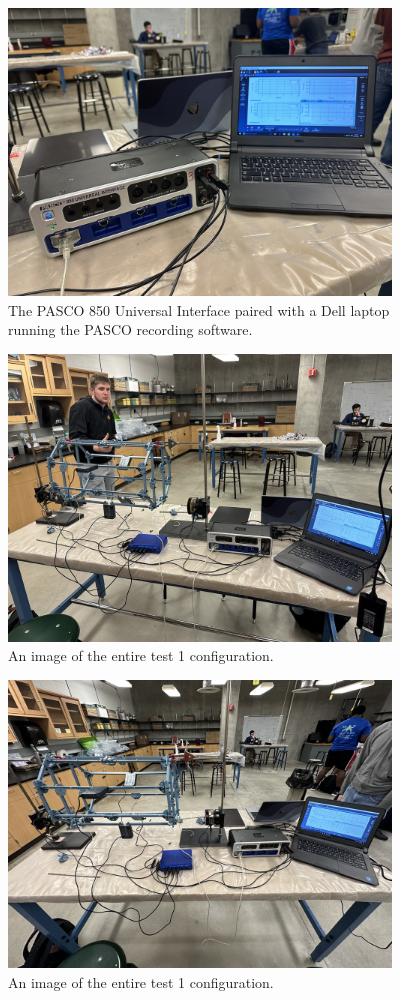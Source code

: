 \documentclass[12 pt]{report}
\begin{document}
\begin{figure}[htbp]
	\centering
	\includegraphics[width=4in]{images/IMG_1319}
	\caption{The PASCO 850 Universal Interface paired with a Dell laptop running the PASCO recording software.}
	\label{fig:test1_app_8}
\end{figure}

\begin{figure}[htbp]
	\centering
	\includegraphics[width=4in]{images/IMG_1320}
	\caption{An image of the entire test \num {1} configuration.}
	\label{fig:test1_app_9}
\end{figure}

\begin{figure}[htbp]
	\centering
	\includegraphics[width=4in]{images/IMG_1321}
	\caption{An image of the entire test \num{1} configuration.}
	\label{fig:test1_app_10}
\end{figure}
\end{document}
